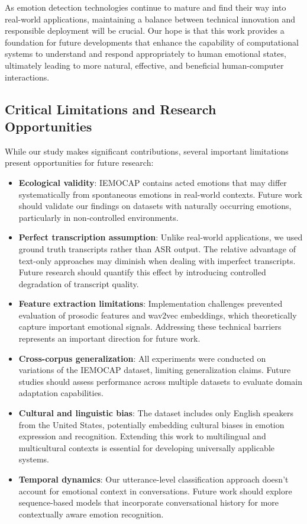 \documentclass[12pt]{article}
\begin{document}
As emotion detection technologies continue to mature and find their way into real-world applications, maintaining a balance between technical innovation and responsible deployment will be crucial. Our hope is that this work provides a foundation for future developments that enhance the capability of computational systems to understand and respond appropriately to human emotional states, ultimately leading to more natural, effective, and beneficial human-computer interactions.

\subsection{Critical Limitations and Research Opportunities}
While our study makes significant contributions, several important limitations present opportunities for future research:

\begin{itemize}
    \item \textbf{Ecological validity}: IEMOCAP contains acted emotions that may differ systematically from spontaneous emotions in real-world contexts. Future work should validate our findings on datasets with naturally occurring emotions, particularly in non-controlled environments.
    
    \item \textbf{Perfect transcription assumption}: Unlike real-world applications, we used ground truth transcripts rather than ASR output. The relative advantage of text-only approaches may diminish when dealing with imperfect transcripts. Future research should quantify this effect by introducing controlled degradation of transcript quality.
    
    \item \textbf{Feature extraction limitations}: Implementation challenges prevented evaluation of prosodic features and wav2vec embeddings, which theoretically capture important emotional signals. Addressing these technical barriers represents an important direction for future work.
    
    \item \textbf{Cross-corpus generalization}: All experiments were conducted on variations of the IEMOCAP dataset, limiting generalization claims. Future studies should assess performance across multiple datasets to evaluate domain adaptation capabilities.
    
    \item \textbf{Cultural and linguistic bias}: The dataset includes only English speakers from the United States, potentially embedding cultural biases in emotion expression and recognition. Extending this work to multilingual and multicultural contexts is essential for developing universally applicable systems.
    
    \item \textbf{Temporal dynamics}: Our utterance-level classification approach doesn't account for emotional context in conversations. Future work should explore sequence-based models that incorporate conversational history for more contextually aware emotion recognition.
\end{itemize}
\end{document}
